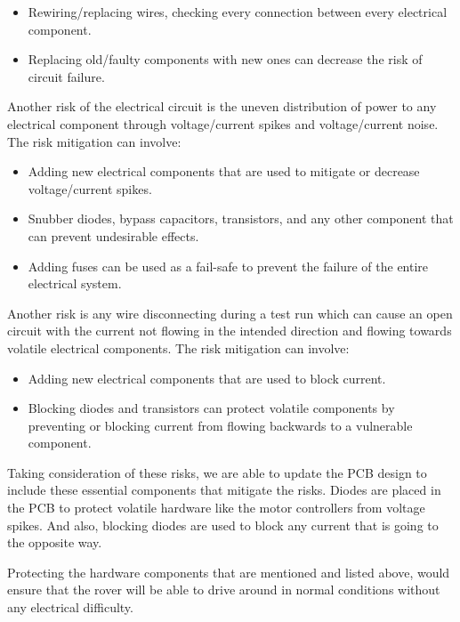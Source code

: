 \documentclass[a4paper, 10pt]{article}
\begin{document}
		\begin{itemize}
		\item Rewiring/replacing wires, checking every connection between every electrical component.

		\item Replacing old/faulty components with new ones can decrease the risk of circuit failure.
		\end{itemize}

		Another risk of the electrical circuit is the uneven distribution of power to any electrical component through voltage/current spikes and voltage/current noise. The risk mitigation can involve:

		\begin{itemize}
		\item Adding new electrical components that are used to mitigate or decrease voltage/current spikes.
		
		\item Snubber diodes, bypass capacitors, transistors, and any other component that can prevent undesirable effects. 
	
		\item Adding fuses can be used as a fail-safe to prevent the failure of the entire electrical system.
		\end{itemize}


		Another risk is any wire disconnecting during a test run which can cause an open circuit with the current not flowing in the intended direction and flowing towards volatile electrical components. The risk mitigation can involve:

		\begin{itemize}
		\item Adding new electrical components that are used to block current.

		\item Blocking diodes and transistors can protect volatile components by preventing or blocking current from flowing backwards to a vulnerable component. 
	
		\end{itemize}

		Taking consideration of these risks, we are able to update the PCB design to include these essential components that mitigate the risks. Diodes are placed in the PCB to protect volatile hardware like the motor controllers from voltage spikes. And also, blocking diodes are used to block any current that is going to the opposite way. 

		Protecting the hardware components that are mentioned and listed above, would ensure that the rover will be able to drive around in normal conditions without any electrical difficulty. 
\end{document}

